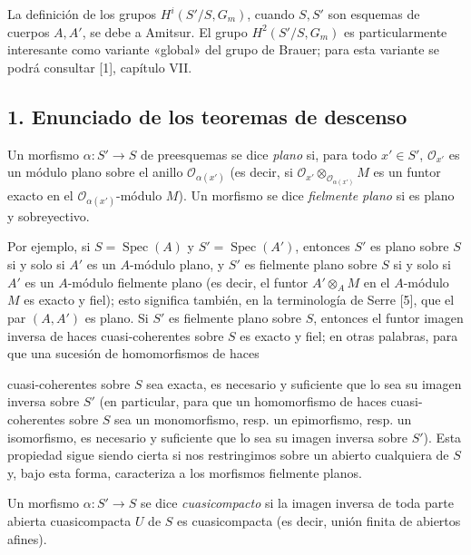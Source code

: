  La definición de los grupos $H^i(S'/S,G_m)$, cuando
$S,S'$ son esquemas de cuerpos $A,A'$, se debe a Amitsur. El grupo
$H^2(S'/S,G_m)$ es particularmente interesante como variante «global» del
grupo de Brauer; para esta variante se podrá consultar [1], capítulo VII.


\subsection*{1. Enunciado de los teoremas de descenso}

 Un morfismo
$\alpha:S'\longrightarrow S$ de preesquemas se dice \emph{plano} si, para todo
$x'\in S'$, $\mathcal O_{x'}$ es un módulo plano sobre el anillo
$\mathcal O_{\alpha(x')}$ (es decir, si
$\mathcal O_{x'}\otimes_{\mathcal O_{\alpha(x')}}M$ es un funtor exacto en el
$\mathcal O_{\alpha(x')}$-módulo $M$). Un morfismo se dice
\emph{fielmente plano} si es plano y sobreyectivo.

Por ejemplo, si $S=\operatorname{Spec}(A)$ y
$S'=\operatorname{Spec}(A')$, entonces $S'$ es plano sobre $S$ si y solo si
$A'$ es un $A$-módulo plano, y $S'$ es fielmente plano sobre $S$ si y solo si
$A'$ es un $A$-módulo fielmente plano (es decir, el funtor
$A'\otimes_A M$ en el $A$-módulo $M$ es exacto y fiel); esto significa también,
en la terminología de Serre [5], que el par $(A,A')$ es plano. Si $S'$ es
fielmente plano sobre $S$, entonces el funtor imagen inversa de haces
cuasi-coherentes sobre $S$ es exacto y fiel; en otras palabras, para que una
sucesión de homomorfismos de haces

cuasi-coherentes sobre $S$ sea exacta, es necesario y suficiente que lo sea su
imagen inversa sobre $S'$ (en particular, para que un homomorfismo de haces
cuasi-coherentes sobre $S$ sea un monomorfismo, resp. un epimorfismo, resp. un
isomorfismo, es necesario y suficiente que lo sea su imagen inversa sobre
$S'$). Esta propiedad sigue siendo cierta si nos restringimos sobre un abierto
cualquiera de $S$ y, bajo esta forma, caracteriza a los morfismos fielmente
planos.

 Un morfismo $\alpha:S'\longrightarrow S$ se dice
\emph{cuasicompacto} si la imagen inversa de toda parte abierta cuasicompacta
$U$ de $S$ es cuasicompacta (es decir, unión finita de abiertos afines).


